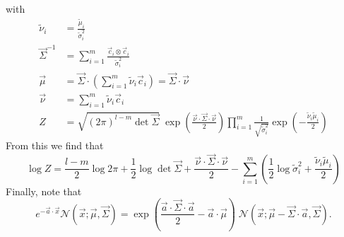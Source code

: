 \documentclass[11pt,twoside]{report}
\def\includebibliography{}
\begin{document}
with
\begin{subequations}
\begin{align}
  \widetilde{\nu}_i &= \frac{\widetilde{\mu}_i}{\widetilde{\sigma}_i^2} \\
  \vec{\Sigma}^{-1} &= \sum_{i=1}^m \frac{\vec{c}_i \otimes \vec{c}_i}{\widetilde{\sigma}_i^2}
  \label{eq:combined-normals-sigma}
  \\
  \vec{\mu} &=
  \vec{\Sigma} \cdot \left( \sum_{i=1}^m \widetilde{\nu}_i \vec{c}_i \right)
  = \vec{\Sigma} \cdot \vec{\nu}
  \\
  \vec{\nu} &= \sum_{i=1}^m \widetilde{\nu}_i \vec{c}_i
  \label{eq:combined-normals-nu}
  \\
  Z &=
  \sqrt{ (2\pi)^{l-m} \det{\vec{\Sigma}} }
  \;
  \exp{\left( \frac{\vec{\nu} \cdot \vec{\Sigma} \cdot \vec{\nu}}{2} \right)}
  \prod_{i=1}^m
  \frac{1}{\sqrt{ \widetilde{\sigma}_i^2 }}
  \exp{\left(-\frac{\widetilde{\nu}_i \widetilde{\mu}_i}{2}\right)}
  \label{eq:combined-normals-Z}
\end{align}
\end{subequations}
From this we find that
\begin{equation}
  \log{Z} =
  \frac{l-m}{2} \log{2\pi} +
  \frac{1}{2} \log\det{\vec{\Sigma}} +
  \frac{\vec{\nu} \cdot \vec{\Sigma} \cdot \vec{\nu}}{2} -
  \sum_{i=1}^m
  \left(
  \frac{1}{2} \log{\widetilde{\sigma}_i^2} +
  \frac{\widetilde{\nu}_i \widetilde{\mu}_i}{2}
  \right)
\end{equation}
Finally, note that
\begin{equation}\label{eq:biased-normal}
  e^{-\vec{a} \cdot \vec{x}} \mathcal{N}(\vec{x}; \vec{\mu}, \vec{\Sigma})
  =
  \exp{\left( \frac{\vec{a} \cdot \vec{\Sigma} \cdot \vec{a}}{2} - \vec{a} \cdot \vec{\mu} \right)} \;
  \mathcal{N}(\vec{x}; \vec{\mu} - \vec{\Sigma}\cdot\vec{a}, \vec{\Sigma}).
\end{equation}


\ifdefined\includebibliography
  \printbibliography
\fi
\end{document}
